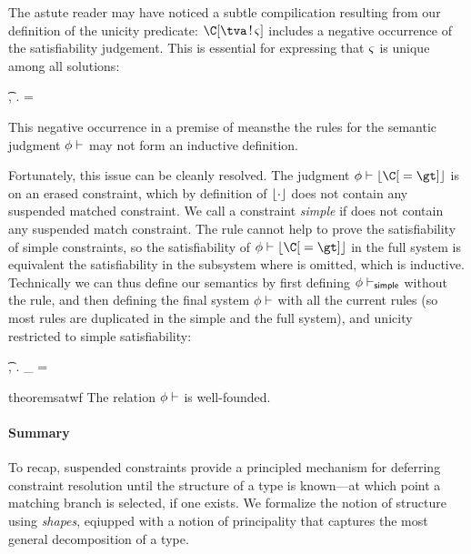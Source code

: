\documentclass[acmsmall,screen,nonacm,review]{acmart}
\begin{document}
The astute reader may have noticed a subtle compilication resulting
from our definition of the unicity predicate:
$\Cshape \C \tv \sh$ includes a negative occurrence of the
satisfiability judgement. This is essential for expressing that
$\varsigma$ is unique among all solutions:
\begin{mathline}
    \Cshape \C \t \sh \Wide\eqdef \forall \semenv, \gt. \uad
      \semenv \th \cerase {\C\where{\cunif \t \gt}} \implies \shape \gt = \sh
\end{mathline}
This negative occurrence in a premise of 
meansthe the rules for the semantic judgment
$\phi \vdash \relax$ may not form an inductive definition.

Fortunately, this issue can be cleanly resolved. The judgment $\semenv \th \cerase {\C\where{\cunif \t \gt}}$ is on an erased constraint, which by definition of $\lfloor \cdot \rfloor$ does not contain any suspended matched constraint. We call a constraint \emph{simple} if does not contain any suspended match constraint. The rule  cannot help to prove the satisfiability of simple constraints, so the satisfiability of $\semenv \th \cerase {\C\where{\cunif \t \gt}}$ in the full system is equivalent the satisfiability in the subsystem where  is omitted, which is inductive. Technically we can thus define our semantics by first defining $\phi \vdash_\mathsf{simple} \relax$ without the  rule, and then defining the final system $\phi \vdash \relax$ with all the current rules (so most rules are duplicated in the simple and the full system), and unicity restricted to simple satisfiability:
\begin{mathline}
    \Cshape \C \t \sh \Wide\eqdef \forall \semenv, \gt. \uad
      \semenv \th_{} \cerase {\C\where{\cunif \t \gt}} \implies \shape \gt = \sh
\end{mathline}

\begin{restatable}{theorem}{satwf}
  The relation $\phi \vdash \relax$ is well-founded.
\end{restatable}

\paragraph{Summary}

To recap, suspended constraints provide a principled mechanism
for deferring constraint resolution until the structure of a type
is known---at which point a matching branch is selected, if one exists.
%
We formalize the notion of structure using \emph{shapes}, eqiupped with a
notion of principality that captures the most general decomposition of a
type.
\end{document}
